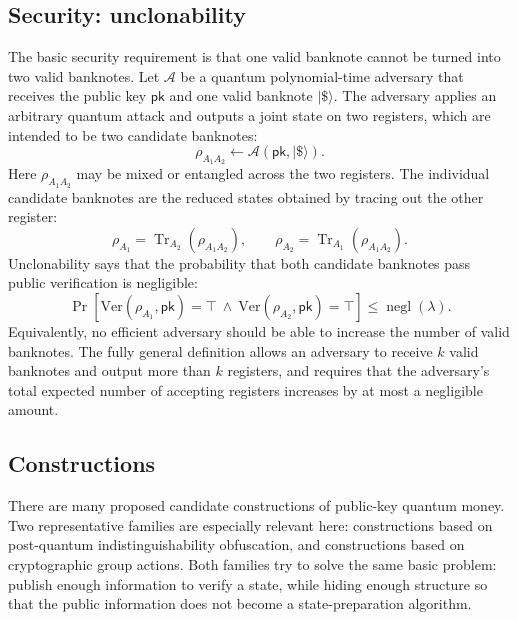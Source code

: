 \documentclass[12pt]{article}
\begin{document}
\subsection{Security: unclonability}
The basic security requirement is that one valid banknote cannot be turned into two valid banknotes.
Let $\mathcal{A}$ be a quantum polynomial-time adversary that receives the public key $\mathsf{pk}$ and one valid banknote $|\$\rangle$.
The adversary applies an arbitrary quantum attack and outputs a joint state on two registers, which are intended to be two candidate banknotes:
\[
\rho_{A_1A_2} \leftarrow \mathcal{A}(\mathsf{pk},|\$\rangle).
\]
Here $\rho_{A_1A_2}$ may be mixed or entangled across the two registers.
The individual candidate banknotes are the reduced states obtained by tracing out the other register:
\[
\rho_{A_1}=\operatorname{Tr}_{A_2}(\rho_{A_1A_2}), \qquad
\rho_{A_2}=\operatorname{Tr}_{A_1}(\rho_{A_1A_2}).
\]
Unclonability says that the probability that both candidate banknotes pass public verification is negligible:
\[
\Pr\!\left[
\mathrm{Ver}(\rho_{A_1},\mathsf{pk})=\top
\ \land\
\mathrm{Ver}(\rho_{A_2},\mathsf{pk})=\top
\right]
\le \operatorname{negl}(\lambda).
\]
Equivalently, no efficient adversary should be able to increase the number of valid banknotes.
The fully general definition allows an adversary to receive $k$ valid banknotes and output more than $k$ registers, and requires that the adversary's total expected number of accepting registers increases by at most a negligible amount.

\subsection{Constructions}
There are many proposed candidate constructions of public-key quantum money.
Two representative families are especially relevant here: constructions based on post-quantum indistinguishability obfuscation, and constructions based on cryptographic group actions.
Both families try to solve the same basic problem: publish enough information to verify a state, while hiding enough structure so that the public information does not become a state-preparation algorithm.
\end{document}
